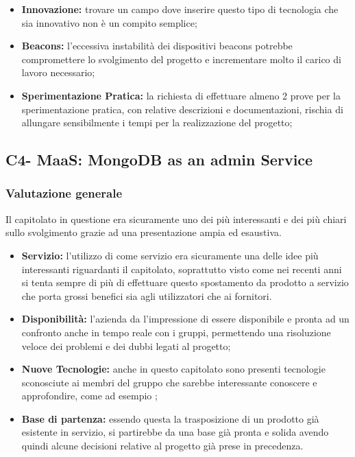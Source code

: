 \begin{itemize}
	\item \textbf{Innovazione:} trovare un campo dove inserire questo tipo di tecnologia che sia innovativo non è un compito semplice;
\end{itemize}

\begin{itemize}
	\item \textbf{Beacons:} l'eccessiva instabilità dei dispositivi beacons potrebbe compromettere lo svolgimento del progetto e incrementare molto il carico di lavoro necessario;
\end{itemize}

\begin{itemize}
	\item \textbf{Sperimentazione Pratica:} la richiesta di effettuare almeno 2 prove per la sperimentazione pratica, con relative descrizioni e documentazioni, rischia di allungare sensibilmente i tempi per la realizzazione del progetto;
\end{itemize}



\subsection{C4- MaaS: MongoDB as an admin Service}
\subsubsection{Valutazione generale}

Il capitolato in questione era sicuramente uno dei più interessanti e dei più chiari sullo svolgimento grazie ad una presentazione ampia ed esaustiva.
 \begin{itemize}
	\item \textbf{Servizio:} l'utilizzo di  come servizio era sicuramente una delle idee più interessanti riguardanti il capitolato, soprattutto visto come nei recenti anni si tenta sempre di più di effettuare questo spostamento da prodotto a servizio che porta grossi benefici sia agli utilizzatori che ai fornitori.
	\item\textbf{Disponibilità:} l'azienda da l'impressione di essere disponibile e pronta ad un confronto anche in tempo reale con i gruppi, permettendo una risoluzione veloce dei problemi e dei dubbi legati al progetto;
	\item \textbf{Nuove Tecnologie:} anche in questo capitolato sono presenti tecnologie sconosciute ai membri del gruppo che sarebbe interessante conoscere e approfondire, come ad esempio ;
	\item \textbf{Base di partenza:} essendo questa la trasposizione di un prodotto già esistente in servizio, si partirebbe da una base già pronta e solida avendo quindi alcune decisioni relative al progetto già prese in precedenza.
\end{itemize}

